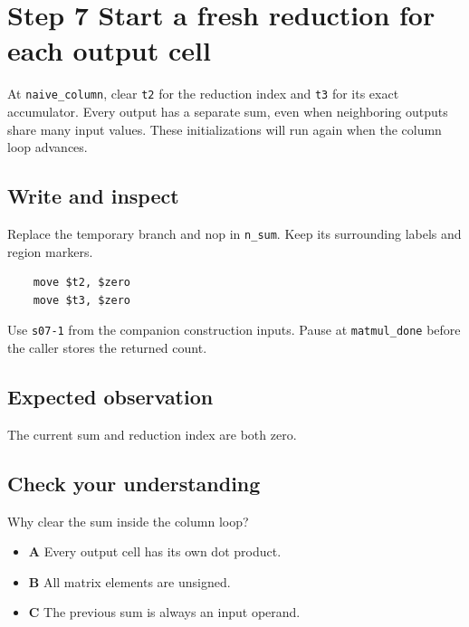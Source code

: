 \section{Step 7 Start a fresh reduction for each output cell}\label{matmul-s07}

At \texttt{naive\_column}, clear \texttt{t2} for the reduction index and \texttt{t3} for its exact accumulator. Every output has a separate sum, even when neighboring outputs share many input values. These initializations will run again when the column loop advances.

\subsection{Write and inspect}
Replace the temporary branch and nop in \texttt{n\_sum}. Keep its surrounding labels and region markers.

\begin{verbatim}
    move $t2, $zero
    move $t3, $zero
\end{verbatim}
Use \texttt{s07-1} from the companion construction inputs. Pause at \texttt{matmul\_done} before the caller stores the returned count.

\subsection{Expected observation}
The current sum and reduction index are both zero.

\subsection{Check your understanding}
Why clear the sum inside the column loop?

\begin{itemize}
\item \textbf{A} Every output cell has its own dot product.
\item \textbf{B} All matrix elements are unsigned.
\item \textbf{C} The previous sum is always an input operand.
\end{itemize}
